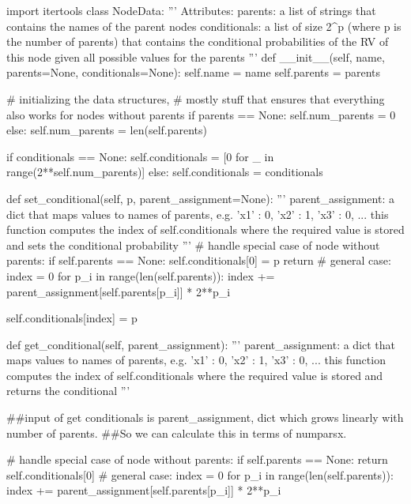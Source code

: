 \begin{python}
import itertools
class NodeData:
    '''
    Attributes:
        parents: a list of strings that contains the names of the parent nodes
        conditionals: a list of size 2^p (where p is the number of parents) 
            that contains the conditional probabilities of the RV of this node given all possible values for the parents
    '''
    def __init__(self, name, parents=None, conditionals=None):
        self.name = name
        self.parents = parents

        # initializing the data structures,
        # mostly stuff that ensures that everything also works for nodes without parents
        if parents == None:
            self.num_parents = 0
        else:
            self.num_parents = len(self.parents)

        if conditionals == None:
            self.conditionals = [0 for _ in range(2**self.num_parents)]
        else:
            self.conditionals = conditionals

            
    def set_conditional(self, p, parent_assignment=None):
        '''
        parent_assignment: a dict that maps values to names of parents, e.g.
        {'x1' : 0, 'x2' : 1, 'x3' : 0, ...}
        this function computes the index of self.conditionals where the required value is stored and sets the conditional probability
        '''
        # handle special case of node without parents:
        if self.parents == None:
            self.conditionals[0] = p
            return
        # general case:
        index = 0
        for p_i in range(len(self.parents)):
            index += parent_assignment[self.parents[p_i]] * 2**p_i

        self.conditionals[index] = p

        
    def get_conditional(self, parent_assignment):
        '''
        parent_assignment: a dict that maps values to names of parents, e.g.
        {'x1' : 0, 'x2' : 1, 'x3' : 0, ...}
        this function computes the index of self.conditionals where the required value is stored and returns the conditional
        '''
        
        ##input of get conditionals is parent_assignment, dict which grows linearly with number of parents. 
        ##So we can calculate this in terms of numparsx. 
        
        # handle special case of node without parents:
        if self.parents == None:
            return self.conditionals[0]
        # general case:
        index = 0
        for p_i in range(len(self.parents)):
            index += parent_assignment[self.parents[p_i]] * 2**p_i


\end{python}
